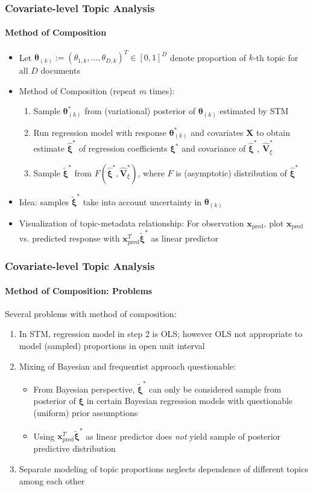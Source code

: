 \documentclass[xcolor=dvipsnames]{beamer}
\begin{document}
\begin{frame}
\frametitle{Covariate-level Topic Analysis}
\framesubtitle{Method of Composition}
\begin{itemize}
\item Let $\boldsymbol{\theta}_{(k)}:=(\theta_{1,k}, \dots, \theta_{D,k})^T \in [0,1]^{D}$ denote proportion of $k$-th topic for all $D$ documents
\item Method of Composition (repeat $m$ times):
\begin{enumerate}
\item Sample $\boldsymbol{\theta}^*_{(k)}$ from (variational) posterior of $\boldsymbol{\theta}_{(k)}$ estimated by STM
\item Run regression model with response $\boldsymbol{\theta}^*_{(k)}$ and covariates $\boldsymbol{X}$ to obtain estimate $\hat{\boldsymbol{\xi}}^*$ of regression coefficients $\boldsymbol{\xi}^*$ and covariance of $\hat{\boldsymbol{\xi}}^*$, $\hat{\boldsymbol{V}}^*_{\xi}$
\item Sample $\tilde{\boldsymbol{\xi}}^*$ from $F(\hat{\boldsymbol{\xi}}^*, \hat{\boldsymbol{V}}^*_{\xi})$, where $F$ is (asymptotic) distribution of $\hat{\boldsymbol{\xi}}^*$
\end{enumerate}
\item Idea: samples $\tilde{\boldsymbol{\xi}}^*$ take into account uncertainty in $\boldsymbol{\theta}_{(k)}$
\item Visualization of topic-metadata relationship: For observation $\boldsymbol{x}_{\text{pred}}$, plot $\boldsymbol{x}_{\text{pred}}$ vs. predicted response with $\boldsymbol{x}_{\text{pred}}^T \tilde{\boldsymbol{\xi}}^*$ as linear predictor
\end{itemize}
\end{frame}

\begin{frame}
\frametitle{Covariate-level Topic Analysis}
\framesubtitle{Method of Composition: Problems}
Several problems with method of composition:
\begin{enumerate}
\item In STM, regression model in step 2 is OLS; however OLS not appropriate to model (sampled) proportions in open unit interval
\item Mixing of Bayesian and frequentist approach questionable:
\begin{itemize}
\item From Bayesian perspective, $\tilde{\boldsymbol{\xi}}^*$ can only be considered sample from posterior of $\boldsymbol{\xi}$ in certain Bayesian regression models with questionable (uniform) prior assumptions
\item Using $\boldsymbol{x}_{\text{pred}}^T \tilde{\boldsymbol{\xi}}^*$  as linear predictor does \textit{not} yield sample of posterior predictive distribution
\end{itemize}
\item Separate modeling of topic proportions neglects dependence of different topics among each other
\end{enumerate}
\end{frame}
\end{document}
